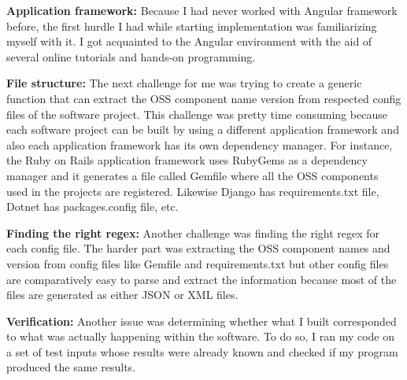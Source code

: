 \textbf{Application framework:} Because I had never worked with Angular framework before, the first hurdle I had while starting implementation was familiarizing myself with it. I got acquainted to the Angular environment with the aid of several online tutorials and hands-on programming.
	
\textbf{File structure:} The next challenge for me was trying to create a generic function that can extract the \acs{OSS} component name version from respected config files of the software project. This challenge was pretty time consuming because each software project can be built by using a different application framework and also each application framework has its own dependency manager. For instance, the Ruby on Rails application framework uses RubyGems as a dependency manager and it generates a file called Gemfile where all the \acs{OSS} components used in the projects are registered. Likewise Django has requirements.txt file, Dotnet has packages.config file, etc.
	
	
\textbf{Finding the right regex:} Another challenge was finding the right regex for each config file. The harder part was extracting the \acs{OSS} component names and version from config files like Gemfile and requirements.txt but other config files are comparatively easy to parse and extract the information because most of the files are generated as either \acs{JSON} or \acs{XML} files.
	
\textbf{Verification:} Another issue was determining whether what I built corresponded to what was actually happening within the software. To do so, I ran my code on a set of test inputs whose results were already known and checked if my program produced the same results.

%

